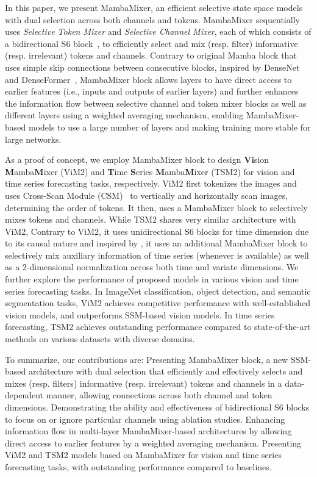 \documentclass{article}
\newcommand{\head}[1]{\vspace{1.7mm}\noindent{{\textcolor{c1}{\bf #1.}}}}
\newcommand*\circled[1]{\tikz[baseline=(char.base)]{
            \node[shape=circle,draw,inner sep=0.3pt, fill=c2] (char) {\textcolor{white}{#1}};}}
\begin{document}
In this paper, we present MambaMixer, an efficient selective state space models with dual selection across both channels and tokens. MambaMixer sequentially uses \emph{Selective Token Mixer} and \emph{Selective Channel Mixer}, each of which consists of a bidirectional S6 block~\citep{gu2023mamba}, to efficiently select and mix (resp. filter) informative (resp. irrelevant) tokens and channels. Contrary to original Mamba block that uses simple skip connections between consecutive blocks, inspired by DenseNet~\citep{huang2017densely} and DenseFormer~\citep{pagliardini2024denseformer}, MambaMixer block allows layers to have direct access to earlier features (i.e., inputs and outputs of earlier layers) and further enhances the information flow between selective channel and token mixer blocks as well as different layers using a weighted averaging mechanism, enabling MambaMixer-based models to use a large number of layers and making training more stable for large networks. 


As a proof of concept, we employ MambaMixer block to design \textbf{Vi}sion \textbf{M}amba\textbf{M}ixer (ViM2) and \textbf{T}ime \textbf{S}eries \textbf{M}amba\textbf{M}ixer (TSM2) for vision and time series forecasting tasks, respectively. ViM2 first tokenizes the images and uses Cross-Scan Module (CSM)~\citep{liu2024vmamba} to vertically and horizontally scan images, determining the order of tokens. It then, uses a MambaMixer block to selectively mixes tokens and channels. While TSM2 shares very similar architecture with ViM2, Contrary to ViM2, it uses unidirectional S6 blocks for time dimension due to its causal nature and inspired by \citep{chen2023tsmixer}, it uses an additional MambaMixer block to selectively mix auxiliary information of time series (whenever is available) as well as a 2-dimensional normalization across both time and variate dimensions. We further explore the performance of proposed models in various vision and time series forecasting tasks. In ImageNet classification, object detection, and semantic segmentation tasks, ViM2 achieves competitive performance with well-established vision models, and outperforms SSM-based vision models. In time series forecasting, TSM2 achieves outstanding performance compared to state-of-the-art methods on various datasets with diverse domains. 






\head{Contributions} To summarize, our contributions are: \circled{1} Presenting MambaMixer block, a new SSM-based architecture with dual selection that efficiently and effectively selects and mixes (resp. filters) informative (resp. irrelevant) tokens and channels in a data-dependent manner, allowing connections across both channel and token dimensions. \circled{2} Demonstrating the ability and effectiveness of bidirectional S6 blocks to focus on or ignore particular channels using ablation studies. \circled{3} Enhancing information flow in multi-layer MambaMixer-based architectures by allowing direct access to earlier features by a weighted averaging mechanism. \circled{4} Presenting ViM2 and TSM2 models based on MambaMixer for vision and time series forecasting tasks, with outstanding performance compared to baselines. 
\end{document}
